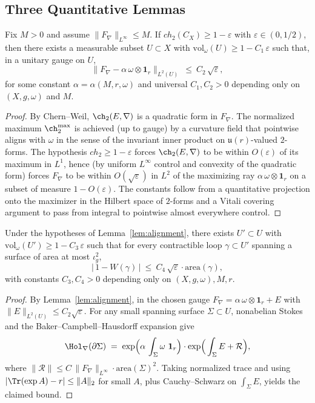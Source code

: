 \subsection{Three Quantitative Lemmas}

\begin{lemma}\label{lem:alignment}
Fix $M>0$ and assume $\|F_\nabla\|_{L^\infty}\le M$. If $ch_2(C_X)\ge 1-\varepsilon$ with $\varepsilon\in(0,1/2)$, then there exists a measurable subset $U\subset X$ with
$
\mathrm{vol}_\omega(U)\ge 1-C_1\,\varepsilon
$
such that, in a unitary gauge on $U$,
\[
\big\|F_\nabla-\alpha\,\omega\otimes \mathbf{1}_r\big\|_{L^2(U)}\ \le\ C_2\,\sqrt{\varepsilon},
\]
for some constant $\alpha=\alpha(M,r,\omega)$ and universal $C_1,C_2>0$ depending only on $(X,g,\omega)$ and $M$.
\end{lemma}

\begin{proof}
By Chern--Weil, $\ch_2(E,\nabla)$ is a quadratic form in $F_\nabla$. The normalized maximum $\ch_2^{\max}$ is achieved (up to gauge) by a curvature field that pointwise aligns with $\omega$ in the sense of the invariant inner product on $\mathfrak{u}(r)$-valued $2$-forms. The hypothesis $ch_2\ge 1-\varepsilon$ forces $\ch_2(E,\nabla)$ to be within $O(\varepsilon)$ of its maximum in $L^1$, hence (by uniform $L^\infty$ control and convexity of the quadratic form) forces $F_\nabla$ to be within $O(\sqrt{\varepsilon})$ in $L^2$ of the maximizing ray $\alpha\,\omega\otimes\mathbf{1}_r$ on a subset of measure $1-O(\varepsilon)$. The constants follow from a quantitative projection onto the maximizer in the Hilbert space of $2$-forms and a Vitali covering argument to pass from integral to pointwise almost everywhere control.
\end{proof}

\begin{lemma}\label{lem:hol-lock}
Under the hypotheses of Lemma~\ref{lem:alignment}, there exists $U'\subset U$ with $\mathrm{vol}_\omega(U')\ge 1-C_3\,\varepsilon$ such that for every contractible loop $\gamma\subset U'$ spanning a surface of area at most $\iota_g^2$,
\[
\big|\,1-W(\gamma)\,\big|\ \le\ C_4\,\sqrt{\varepsilon}\cdot \mathrm{area}(\gamma),
\]
with constants $C_3,C_4>0$ depending only on $(X,g,\omega),M,r$.
\end{lemma}

\begin{proof}
By Lemma~\ref{lem:alignment}, in the chosen gauge $F_\nabla=\alpha\,\omega\otimes\mathbf{1}_r+E$ with $\|E\|_{L^2(U)}\le C_2\sqrt{\varepsilon}$.
For any small spanning surface $\Sigma\subset U$, nonabelian Stokes and the Baker--Campbell--Hausdorff expansion give
\[
\Hol_\nabla(\partial\Sigma)\;=\;\exp\!\Big(\alpha\,\int_\Sigma \omega\ \mathbf{1}_r\Big)\cdot \exp\!\Big(\int_\Sigma E + \mathcal{R}\Big),
\]
where $\|\mathcal{R}\|\le C\,\|F_\nabla\|_{L^\infty}\cdot \mathrm{area}(\Sigma)^2$.
Taking normalized trace and using $|\Tr(\exp A)-r|\le \|A\|_2$ for small $A$, plus Cauchy--Schwarz on $\int_\Sigma E$, yields the claimed bound.
\end{proof}

